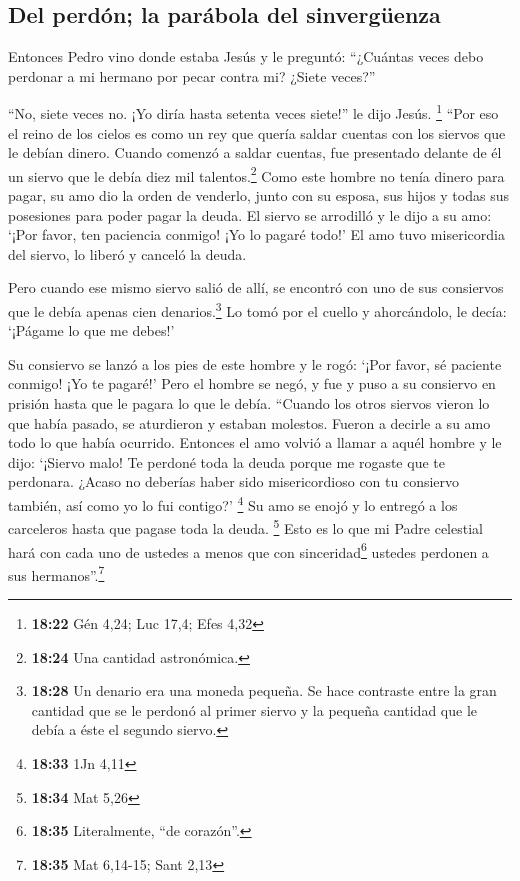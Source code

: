 \hypertarget{del-perduxf3n-la-paruxe1bola-del-sinverguxfcenza}{%
\subsection{Del perdón; la parábola del
sinvergüenza}\label{del-perduxf3n-la-paruxe1bola-del-sinverguxfcenza}}

 Entonces Pedro vino donde estaba Jesús y le preguntó:
``¿Cuántas veces debo perdonar a mi hermano por pecar contra mi? ¿Siete
veces?''

 ``No, siete veces no. ¡Yo diría hasta setenta veces
siete!'' le dijo Jesús. \footnote{\textbf{18:22} Gén 4,24; Luc 17,4;
  Efes 4,32}  ``Por eso el reino de los cielos es como un
rey que quería saldar cuentas con los siervos que le debían dinero.
 Cuando comenzó a saldar cuentas, fue presentado delante
de él un siervo que le debía diez mil talentos.\footnote{\textbf{18:24}
  Una cantidad astronómica.}  Como este hombre no tenía
dinero para pagar, su amo dio la orden de venderlo, junto con su esposa,
sus hijos y todas sus posesiones para poder pagar la deuda.
 El siervo se arrodilló y le dijo a su amo: `¡Por favor,
ten paciencia conmigo! ¡Yo lo pagaré todo!'  El amo tuvo
misericordia del siervo, lo liberó y canceló la deuda.

 Pero cuando ese mismo siervo salió de allí, se encontró
con uno de sus consiervos que le debía apenas cien denarios.\footnote{\textbf{18:28}
  Un denario era una moneda pequeña. Se hace contraste entre la gran
  cantidad que se le perdonó al primer siervo y la pequeña cantidad que
  le debía a éste el segundo siervo.} Lo tomó por el cuello y
ahorcándolo, le decía: `¡Págame lo que me debes!'

 Su consiervo se lanzó a los pies de este hombre y le
rogó: `¡Por favor, sé paciente conmigo! ¡Yo te pagaré!' 
Pero el hombre se negó, y fue y puso a su consiervo en prisión hasta que
le pagara lo que le debía.  ``Cuando los otros siervos
vieron lo que había pasado, se aturdieron y estaban molestos. Fueron a
decirle a su amo todo lo que había ocurrido.  Entonces el
amo volvió a llamar a aquél hombre y le dijo: `¡Siervo malo! Te perdoné
toda la deuda porque me rogaste que te perdonara.  ¿Acaso
no deberías haber sido misericordioso con tu consiervo también, así como
yo lo fui contigo?' \footnote{\textbf{18:33} 1Jn 4,11} 
Su amo se enojó y lo entregó a los carceleros hasta que pagase toda la
deuda. \footnote{\textbf{18:34} Mat 5,26}  Esto es lo que
mi Padre celestial hará con cada uno de ustedes a menos que con
sinceridad\footnote{\textbf{18:35} Literalmente, ``de corazón''.}
ustedes perdonen a sus hermanos''.\footnote{\textbf{18:35} Mat 6,14-15;
  Sant 2,13}

